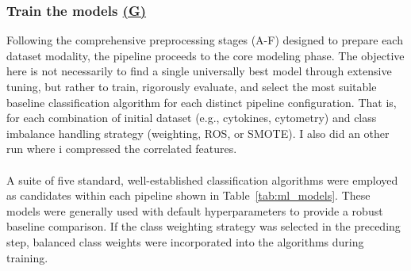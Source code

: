 \documentclass[12pt,a4paper]{report}
\begin{document}
\subsubsection*{Train the models \hyperref[fig:pipeline-1]{(G)}}
\noindent
Following the comprehensive preprocessing stages (A-F) designed to prepare each dataset modality, the pipeline proceeds to the core modeling phase. The objective here is not necessarily to find a single universally best model through extensive tuning, but rather to train, rigorously evaluate, and select the most suitable baseline classification algorithm for each distinct pipeline configuration. That is, for each combination of initial dataset (e.g., cytokines, cytometry) and class imbalance handling strategy (weighting, ROS, or SMOTE). I also did an other run where i compressed the correlated features.\\
\\
A suite of five standard, well-established classification algorithms were employed as candidates within each pipeline shown in Table~\ref{tab:ml_models}. These models were generally used with default hyperparameters to provide a robust baseline comparison. If the class weighting strategy was selected in the preceding step, balanced class weights were incorporated into the algorithms during training.\\
\begin{table}[h!]
    \centering
    \caption[Machine Learning Models Used]{Machine Learning Models Used and their Configurations}
    \label{tab:ml_models}
\end{table}
\end{document}
